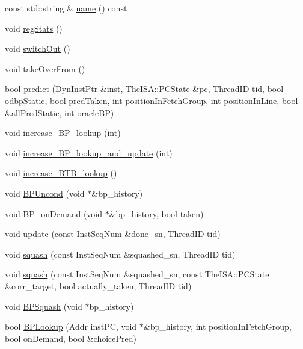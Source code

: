 \begin{DoxyCompactItemize}
\item 
const std::string \& \hyperlink{classBPredUnit_aeaaeb15f110f0ed58cc3161d6f6ace22}{name} () const 
\item 
void \hyperlink{classBPredUnit_a0cffcea165538b2e7fd554a92b8d9b85}{regStats} ()
\item 
void \hyperlink{classBPredUnit_ac33c3d29c7b6aca9578fc416eb34e60e}{switchOut} ()
\item 
void \hyperlink{classBPredUnit_a9011bcc9143d2396dfec49828484a645}{takeOverFrom} ()
\item 
bool \hyperlink{classBPredUnit_add836c4a521ed2bd12eca4d1dee13620}{predict} (DynInstPtr \&inst, TheISA::PCState \&pc, ThreadID tid, bool odbpStatic, bool predTaken, int positionInFetchGroup, int positionInLine, bool \&allPredStatic, int oracleBP)
\item 
void \hyperlink{classBPredUnit_a89690e897bb5661ee868f659a06515c9}{increase\_\-BP\_\-lookup} (int)
\item 
void \hyperlink{classBPredUnit_a471a1acb994d07a6d57b2f39ce56e6a4}{increase\_\-BP\_\-lookup\_\-and\_\-update} (int)
\item 
void \hyperlink{classBPredUnit_a41ecb08c99f45538eaf1de4e184905b4}{increase\_\-BTB\_\-lookup} ()
\item 
void \hyperlink{classBPredUnit_a24bfe00e5e8c2a318930a6474ed60173}{BPUncond} (void $\ast$\&bp\_\-history)
\item 
void \hyperlink{classBPredUnit_a282f0c689c4cedfb52221c1ce96b4084}{BP\_\-onDemand} (void $\ast$\&bp\_\-history, bool taken)
\item 
void \hyperlink{classBPredUnit_aa154b29fbf52ad49d89a046e94b53ac9}{update} (const InstSeqNum \&done\_\-sn, ThreadID tid)
\item 
void \hyperlink{classBPredUnit_a94a04b4bdf8f6b9b3cf33882bc16067b}{squash} (const InstSeqNum \&squashed\_\-sn, ThreadID tid)
\item 
void \hyperlink{classBPredUnit_a78e6f48f8a11db90daab850527d48aa7}{squash} (const InstSeqNum \&squashed\_\-sn, const TheISA::PCState \&corr\_\-target, bool actually\_\-taken, ThreadID tid)
\item 
void \hyperlink{classBPredUnit_a14a43c5f5bc8c64c07a075ce1608f9c3}{BPSquash} (void $\ast$bp\_\-history)
\item 
bool \hyperlink{classBPredUnit_aafefe8c8d85f49d118e825fa0c1c0176}{BPLookup} (Addr instPC, void $\ast$\&bp\_\-history, int positionInFetchGroup, bool onDemand, bool \&choicePred)

\end{DoxyCompactItemize}
